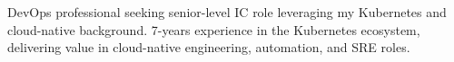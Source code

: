 

\begin{cvparagraph}

DevOps professional seeking senior-level IC role leveraging my Kubernetes and cloud-native background. 7-years experience in the Kubernetes ecosystem, delivering value in cloud-native engineering, automation, and SRE roles. 

\end{cvparagraph}
